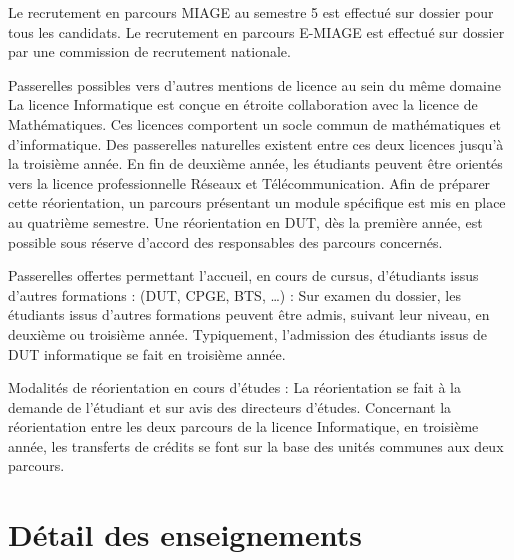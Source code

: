 \documentclass[10pt, a5paper]{report}
\begin{document}
\begin{spacing}{1.5}
Le recrutement en parcours MIAGE au semestre 5 est effectué sur dossier pour tous les candidats. 
Le recrutement en parcours E-MIAGE est effectué sur dossier par une commission de recrutement nationale. 

Passerelles possibles vers d'autres mentions de licence au sein du même domaine
La licence Informatique est  conçue en étroite collaboration avec la licence de Mathématiques. Ces licences comportent un socle commun de mathématiques et d'informatique. Des passerelles naturelles existent entre ces deux licences jusqu'à la troisième année.
En fin de deuxième année, les étudiants peuvent être orientés vers la licence professionnelle Réseaux et Télécommunication. Afin de préparer cette réorientation, un parcours présentant un module spécifique est mis en place au quatrième semestre.
Une réorientation en DUT, dès la première année, est possible sous réserve d'accord des responsables des parcours concernés.

Passerelles offertes permettant l'accueil, en cours de cursus, d'étudiants issus d'autres formations : (DUT, CPGE, BTS, …) :
Sur examen du dossier, les étudiants issus d'autres formations peuvent être admis, suivant leur niveau, en deuxième ou troisième année. Typiquement, l'admission des étudiants issus de DUT informatique se fait en troisième année.

Modalités de réorientation en cours d'études :
La réorientation se fait à la demande de l'étudiant et sur avis des directeurs d'études. Concernant la réorientation entre les deux parcours de la licence Informatique, en troisième année, les transferts de crédits se font sur la base des unités communes aux deux parcours.

\section*{Détail des enseignements}

  \end{spacing}
\end{document}
